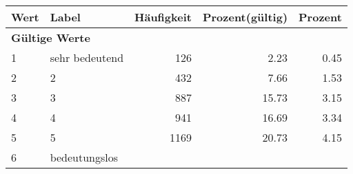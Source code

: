     \begin{longtable}{lXrrr}
     \toprule
     \textbf{Wert} & \textbf{Label} & \textbf{Häufigkeit} & \textbf{Prozent(gültig)} & \textbf{Prozent} \\
     \endhead
     \midrule
     \multicolumn{5}{l}{\textbf{Gültige Werte}}\\

     1 &
     \multicolumn{1}{X}{ sehr bedeutend   } &


       \num{126} &
       \num[round-mode=places,round-precision=2]{2.23} &
         \num[round-mode=places,round-precision=2]{0.45} \\

     2 &
     \multicolumn{1}{X}{ 2   } &


       \num{432} &
       \num[round-mode=places,round-precision=2]{7.66} &
         \num[round-mode=places,round-precision=2]{1.53} \\

     3 &
     \multicolumn{1}{X}{ 3   } &


       \num{887} &
       \num[round-mode=places,round-precision=2]{15.73} &
         \num[round-mode=places,round-precision=2]{3.15} \\

     4 &
     \multicolumn{1}{X}{ 4   } &


       \num{941} &
       \num[round-mode=places,round-precision=2]{16.69} &
         \num[round-mode=places,round-precision=2]{3.34} \\

     5 &
     \multicolumn{1}{X}{ 5   } &


       \num{1169} &
       \num[round-mode=places,round-precision=2]{20.73} &
         \num[round-mode=places,round-precision=2]{4.15} \\

     6 &
     \multicolumn{1}{X}{ bedeutungslos   } &



\end{longtable}
